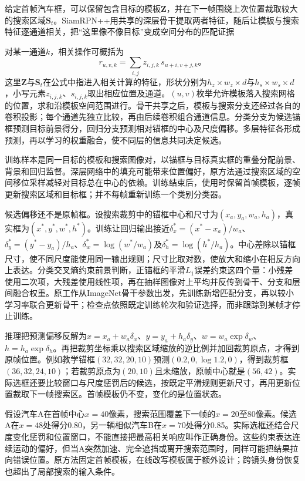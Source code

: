 给定首帧汽车框，可以保留包含目标的模板$\bm{Z}$，并在下一帧围绕上次位置裁取较大的搜索区域$\bm{S}_t$。SiamRPN++用共享的深层骨干提取两者特征，随后让模板与搜索特征逐通道相关，把“这里像不像目标”变成空间分布的匹配证据

对某一通道$k$，相关操作可概括为
\begin{equation}
  r_{u,v,k}=\sum_{i,j}z_{i,j,k}\,s_{u+i,v+j,k}\text{。}
  \label{eq:vision-video-depthwise-correlation}
\end{equation}
这里$\bm{Z}$与$\bm{S}_t$在公式中指进入相关计算的特征，形状分别为$h_z\times w_z\times d$与$h_s\times w_s\times d$，小写元素$z_{i,j,k}$、$s_{i,j,k}$取出相应位置及通道。$(u,v)$枚举允许模板落入搜索网格的位置，求和沿模板空间范围进行。骨干共享之后，模板与搜索分支还经过各自的卷积投影；每个通道先独立比较，再由后续卷积组合通道信息。分类分支为候选锚框预测目标前景得分，回归分支预测相对锚框的中心及尺度偏移。多层特征各形成预测，再以学习的权重融合，使不同层的信息共同决定候选。

训练样本是同一目标的模板和搜索图像对，以锚框与目标真实框的重叠分配前景、背景和回归监督。深层网络中的填充可能带来位置偏好，原方法通过搜索区域的空间移位采样减轻对目标总在中心的依赖。训练结束后，使用时保留首帧模板，逐帧更新搜索区域和目标框；并不每帧重新训练一个类别分类器。

候选偏移还不是原帧框。设搜索裁剪中的锚框中心和尺寸为$(x_a,y_a,w_a,h_a)$，真实框为$(x^*,y^*,w^*,h^*)$。训练让回归输出接近$\delta_x^*=(x^*-x_a)/w_a$、$\delta_y^*=(y^*-y_a)/h_a$、$\delta_w^*=\log(w^*/w_a)$及$\delta_h^*=\log(h^*/h_a)$。中心差除以锚框尺寸，使不同尺度能使用同一输出规则；尺寸比取对数，使放大和缩小在相反方向上表达。分类交叉熵约束前景判断，正锚框的平滑$L_1$误差约束这四个量：小残差使用二次项，大残差使用线性项，再在抽样图像对上平均并反传到骨干、分支和层间融合权重。原工作从ImageNet骨干参数出发，先训练新增匹配分支，再以较小学习率联合更新骨干；检查点依照既定训练轮次和验证选择，而非跟踪到某帧才停止训练。

推理把预测偏移反解为$x=x_a+w_a\delta_x$、$y=y_a+h_a\delta_y$、$w=w_a\exp\delta_w$、$h=h_a\exp\delta_h$。再把裁剪坐标乘以搜索区域缩放的逆比例并加回裁剪原点，才得到原帧位置。例如教学锚框$(32,32,20,10)$预测$(0.2,0,\log1.2,0)$，得到裁剪框$(36,32,24,10)$；若裁剪原点为$(20,10)$且未缩放，原帧中心就是$(56,42)$。实际选框还要比较窗口与尺度惩罚后的候选，按既定平滑规则更新尺寸，再用更新位置裁取下一帧搜索区。首帧模板仍不变，变化的是位置状态。

假设汽车A在首帧中心$x=40$像素，搜索范围覆盖下一帧的$x=20$至80像素。候选A在$x=48$处得分0.80，另一辆相似汽车B在$x=70$处得分0.85。实际选框还结合尺度变化惩罚和位置窗口，不能直接把最高相关响应叫作正确身份。这些约束表达连续运动的偏好，但当A突然加速、完全遮挡或离开搜索范围时，同样可能把结果拉向错误位置。原方法固定首帧模板，在线改写模板属于额外设计；跨镜头身份恢复也超出了局部搜索的输入条件。

